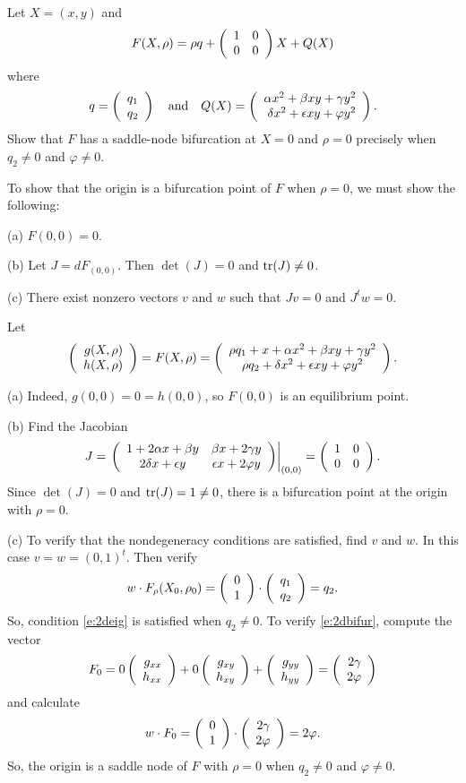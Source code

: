 \documentclass{ximera}
\begin{document}
\begin{exercise} \label{c9.3.4}
Let $X=(x,y)$ and 
\[
F(X,\rho) = \rho q + \left(\begin{array}{rr} 1 & 0\\ 0 &0\end{array}\right) X + Q(X)
\]
where
\[
q=\left(\begin{array}{r} q_1 \\ q_2\end{array}\right) \quad\mbox{and}\quad Q(X) = \left(\begin{array}{r} \alpha x^2+\beta xy+\gamma y^2 \\ \delta x^2 +\epsilon xy+\varphi y^2\end{array}\right).
\]
Show that $F$ has a saddle-node bifurcation at $X=0$ and $\rho=0$ precisely 
when $q_2\neq 0$ and $\varphi\neq 0$. 

\begin{solution}

To show that the origin is a bifurcation point of $F$ when $\rho = 0$, we
must show the following:

(a) $F(0,0) = 0$.

(b) Let $J = dF_{(0,0)}$.  Then $\det(J) = 0$ and ${\rm tr}(J) \neq 0$.

(c) There exist nonzero vectors $v$ and $w$ such that $Jv = 0$ and
$J^tw = 0$.

\soln Let
\[
\left(\begin{array}{r} g(X,\rho) \\ h(X,\rho)\end{array}\right) = F(X,\rho) = 
\left(\begin{array}{c} \rho q_1 + x + \alpha x^2 + \beta xy + \gamma y^2 \\ \rho q_2 + \delta x^2 + \epsilon xy + \varphi y^2\end{array}\right).
\]

(a) Indeed, $g(0,0) = 0 = h(0,0)$, so $F(0,0)$ is an equilibrium point.

(b) Find the Jacobian
\[
J = \left.\left(\begin{array}{cc} 1 + 2\alpha x + \beta y & \beta x + 2\gamma y\\ 2\delta x + \epsilon y &\epsilon x + 2\varphi y\end{array}\right)\right|_{(0,0)} =
\left(\begin{array}{rr} 1 & 0\\ 0 &0\end{array}\right).
\]
Since $\det(J) = 0$ and ${\rm tr}(J) = 1 \neq 0$, there
is a bifurcation point at the origin with $\rho = 0$.

(c)  To verify that the nondegeneracy conditions are satisfied, find $v$
and $w$.  In this case $v = w = (0,1)^t$.  Then verify
\[
w \cdot F_\rho(X_0,\rho_0) = \left(\begin{array}{r} 0 \\ 1\end{array}\right) \cdot \left(\begin{array}{r} q_1 \\ q_2\end{array}\right)
= q_2.
\]
So, condition \eqref{e:2deig} is satisfied when $q_2 \neq 0$.  To
verify \eqref{e:2dbifur}, compute the vector
\[
F_0 = 0\left(\begin{array}{r} g_{xx} \\ h_{xx}\end{array}\right) + 0\left(\begin{array}{r} g_{xy} \\ h_{xy}\end{array}\right) +
\left(\begin{array}{r} g_{yy} \\ h_{yy}\end{array}\right) = \left(\begin{array}{r} 2\gamma \\ 2\varphi\end{array}\right)
\]
and calculate
\[
w \cdot F_0 = \left(\begin{array}{r} 0 \\ 1\end{array}\right) \cdot \left(\begin{array}{r} 2\gamma \\ 2\varphi\end{array}\right)
= 2\varphi.
\]
So, the origin is a saddle node of $F$ with $\rho = 0$ when
$q_2 \neq 0$ and $\varphi \neq 0$.





\end{solution}
\end{exercise}
\end{document}
